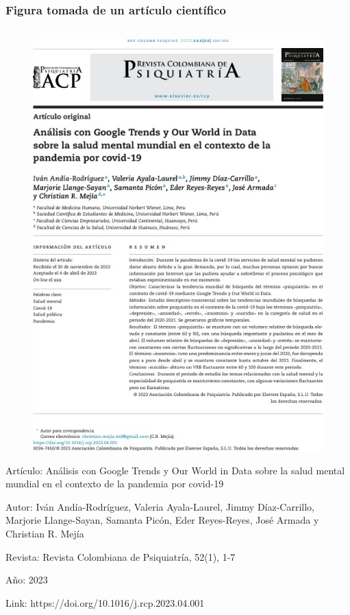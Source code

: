 \documentclass[
11pt, %
]{beamer}
\begin{document}
\begin{frame}
	\frametitle{Figura tomada de un artículo científico}

	\begin{columns}[c] %
		\begin{column}{0.5\textwidth} %
			\begin{figure}
				\centering
				\includegraphics[width=0.4\linewidth]{images/screenshot016}
			\end{figure}
			\scriptsize{

				Artículo: Análisis con Google Trends y Our World in Data sobre la salud mental
				mundial en el contexto de la pandemia por covid-19

				Autor: Iván Andía-Rodríguez, Valeria Ayala-Laurel, Jimmy Díaz-Carrillo,
				Marjorie Llange-Sayan, Samanta Picón, Eder Reyes-Reyes, José Armada y Christian
				R. Mejía

				Revista: Revista Colombiana de Psiquiatría, 52(1), 1-7

				Año: 2023

				Link: https://doi.org/10.1016/j.rcp.2023.04.001 }


\end{column}
\end{columns}
\end{frame}
\end{document}

